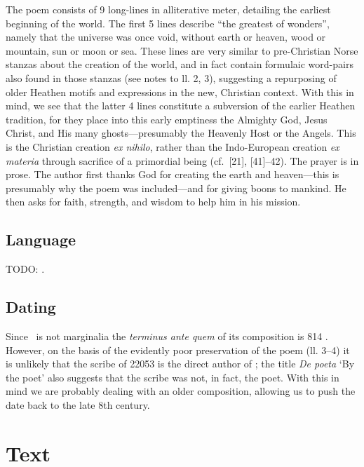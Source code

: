 The poem consists of 9 long-lines in alliterative meter, detailing the earliest beginning of the world.  The first 5 lines describe “the greatest of wonders”, namely that the universe was once void, without earth or heaven, wood or mountain, sun or moon or sea.  These lines are very similar to pre-Christian Norse stanzas about the creation of the world, and in fact contain formulaic word-pairs also found in those stanzas (see notes to ll. 2, 3), suggesting a repurposing of older Heathen motifs and expressions in the new, Christian context.
With this in mind, we see that the latter 4 lines constitute a subversion of the earlier Heathen tradition, for they place into this early emptiness the Almighty God, Jesus Christ, and His many ghosts---presumably the Heavenly Host or the Angels.  This is the Christian creation \emph{ex nihilo}, rather than the Indo-European creation \emph{ex materia} through sacrifice of a primordial being (cf.~[21], [41]--42).
The prayer is in prose.  The author first thanks God for creating the earth and heaven---this is presumably why the poem was included---and for giving boons to mankind.  He then asks for faith, strength, and wisdom to help him in his mission.

\subsection{Language}

TODO: \textcite{Krogmann1937}.

\subsection{Dating}

Since \Wessobrunn\ is not marginalia the \emph{terminus ante quem} of its composition is 814 \ce.  However, on the basis of the evidently poor preservation of the poem (ll. 3--4) it is unlikely that the scribe of \textup{22053} is the direct author of \Wessobrunn; the title \emph{De poeta} ‘By the poet’ also suggests that the scribe was not, in fact, the poet.  With this in mind we are probably dealing with an older composition, allowing us to push the date back to the late 8th century.

\newpage

\section{Text}

